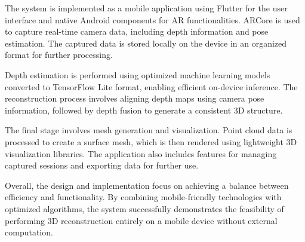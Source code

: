 The system is implemented as a mobile application using Flutter for the user interface and native Android components for AR functionalities. ARCore is used to capture real-time camera data, including depth information and pose estimation. The captured data is stored locally on the device in an organized format for further processing.

Depth estimation is performed using optimized machine learning models converted to TensorFlow Lite format, enabling efficient on-device inference. The reconstruction process involves aligning depth maps using camera pose information, followed by depth fusion to generate a consistent 3D structure.

The final stage involves mesh generation and visualization. Point cloud data is processed to create a surface mesh, which is then rendered using lightweight 3D visualization libraries. The application also includes features for managing captured sessions and exporting data for further use.

Overall, the design and implementation focus on achieving a balance between efficiency and functionality. By combining mobile-friendly technologies with optimized algorithms, the system successfully demonstrates the feasibility of performing 3D reconstruction entirely on a mobile device without external computation.